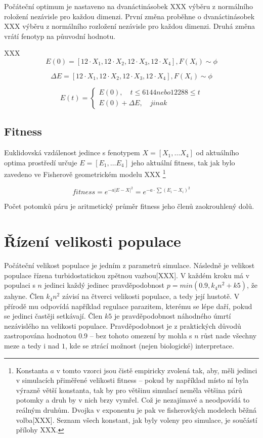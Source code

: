 Počáteční optimum je nastaveno na dvanáctinásobek XXX výběru z normálního roložení nezávisle pro každou dimenzi.
První změna proběhne o dvanáctinásobek XXX  výběru z normálního rozložení nezávisle pro každou dimenzi. Druhá změna
vrátí fenotyp na půuvodní hodnotu.

XXX
$$
E(0) =  [12{\cdot}X_1, 12{\cdot}X_2, 12{\cdot}X_3, 12{\cdot}X_4], F(X_i) \sim \phi
$$

$$
\Delta{E} = [12{\cdot}X_1, 12{\cdot}X_2, 12{\cdot}X_3, 12{\cdot}X_4], F(X_i) \sim \phi
$$

$$
E(t) = \left \{
     \begin{array}{l} E(0), \quad t \leq 6144 nebo 12288 \leq t \\
                      E(0) + \Delta{E}, \quad jinak
\end{array} \right .
$$

\subsection{Fitness}

Euklidovská vzdálenost jedince s fenotypem $X = [X_1,\dots{}X_4]$ od aktuálního optima prostředí určuje
$E = [E_1,\dots{} E_4]$ jeho aktuální fitness, tak jak bylo zavedeno ve Fisherově geometrickém modelu XXX
\footnote{Konstanta $a$ v tomto vzorci jsou čistě empiricky zvolená tak, aby, měli jedinci v simulacích
přiměřené velikosti fitness -- pokud by například místo ní byla výrazně větší konstanta, tak by pro většinu simulací
neměla většina párů potomky a druh by v nich brzy vymřel. Což je nezajímavé a neodpovídá to reálným druhům.
Dvojka v exponentu je pak ve fisherovkých modelech běžná volba[XXX].
Seznam všech konstant, jak byly voleny pro simulace, je součástí přílohy XXX.}

$$fitness = e^{-a |E-X|^2} = e^{-a\cdot{\sum{(E_i - X_i)^2}}}$$

Počet potomků páru je aritmetický průměr fitness jeho členů zaokrouhlený dolů.


\section{Řízení velikosti populace}

Počáteční velikost populace je jedním z parametrů simulace. Následně je velikost populace řízena turbidostatickou
zpětnou vazbou[XXX]. V každém kroku má v populaci s $n$ jedinci každý jedinec pravděpodobnost
$p = min(0.9, k_4 n^2 + k5)$, že zahyne. Člen $k_4 n^2$ závisí na čtverci velikosti populace, a tedy její hustotě.
V přírodě mu odpovídá například regulace parazitem, kterému se lépe daří, pokud se jedinci častěji setkávají.
Člen $k5$ je pravděpodobnost náhodného úmrtí nezávislého na velikosti populace. Pravděpodobnost je z praktických důvodů
zastropována hodnotou 0.9 -- bez tohoto omezení by mohla s $n$ růst nade všechny meze a tedy i nad $1$, kde se ztrácí
možnost (nejen biologické) interpretace.

